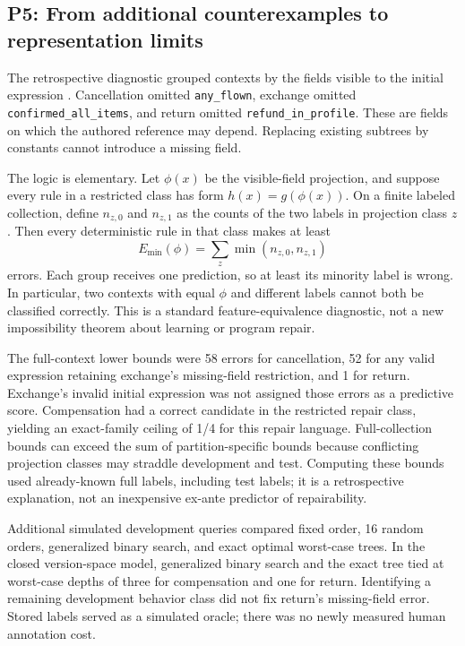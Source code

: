 \documentclass[10pt,twocolumn,letterpaper]{article}
\begin{document}
\subsection{P5: From additional counterexamples to representation limits}
The retrospective diagnostic grouped contexts by the fields visible to the initial expression \cite{pflimits}. Cancellation omitted \texttt{any\_flown}, exchange omitted \texttt{confirmed\_all\_items}, and return omitted \texttt{refund\_in\_profile}. These are fields on which the authored reference may depend. Replacing existing subtrees by constants cannot introduce a missing field.

The logic is elementary. Let $\phi(x)$ be the visible-field projection, and suppose every rule in a restricted class has form $h(x)=g(\phi(x))$. On a finite labeled collection, define $n_{z,0}$ and $n_{z,1}$ as the counts of the two labels in projection class $z$. Then every deterministic rule in that class makes at least
\begin{equation}
E_{\min}(\phi)=\sum_z\min(n_{z,0},n_{z,1})
\label{eq:lower}
\end{equation}
errors. Each group receives one prediction, so at least its minority label is wrong. In particular, two contexts with equal $\phi$ and different labels cannot both be classified correctly. This is a standard feature-equivalence diagnostic, not a new impossibility theorem about learning or program repair.

The full-context lower bounds were 58 errors for cancellation, 52 for any valid expression retaining exchange's missing-field restriction, and 1 for return. Exchange's invalid initial expression was not assigned those errors as a predictive score. Compensation had a correct candidate in the restricted repair class, yielding an exact-family ceiling of 1/4 for this repair language. Full-collection bounds can exceed the sum of partition-specific bounds because conflicting projection classes may straddle development and test. Computing these bounds used already-known full labels, including test labels; it is a retrospective explanation, not an inexpensive ex-ante predictor of repairability.

Additional simulated development queries compared fixed order, 16 random orders, generalized binary search, and exact optimal worst-case trees. In the closed version-space model, generalized binary search and the exact tree tied at worst-case depths of three for compensation and one for return. Identifying a remaining development behavior class did not fix return's missing-field error. Stored labels served as a simulated oracle; there was no newly measured human annotation cost.
\end{document}
